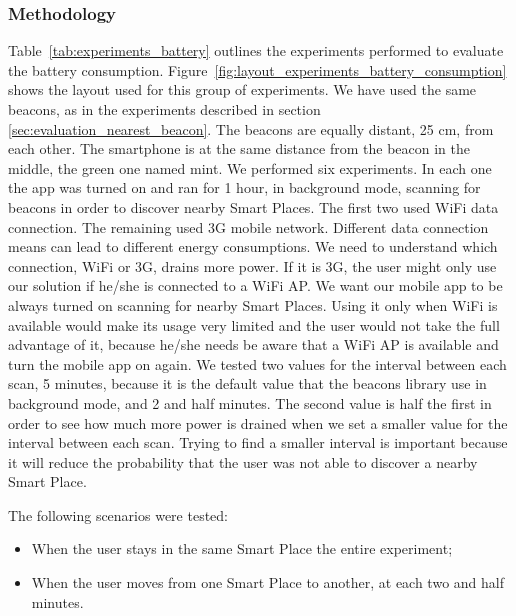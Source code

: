 \subsubsection{Methodology}
\label{sub:evaluation_energy_consumption_methodology}
Table~\ref{tab:experiments_battery} outlines the experiments performed to evaluate the battery consumption.
Figure~\ref{fig:layout_experiments_battery_consumption} shows the layout used for this group of experiments.
We have used the same beacons, as in the experiments described in section \ref{sec:evaluation_nearest_beacon}.
The beacons are equally distant, 25 cm, from each other.
The smartphone is at the same distance from the beacon in the middle, the green one named mint.
We performed six experiments.
In each one the app was turned on and ran for 1 hour, in background mode, scanning for beacons in order to discover nearby Smart Places.
The first two used \gls{WiFi} data connection.
The remaining used \gls{3G} mobile network.
Different data connection means can lead to different energy consumptions.
We need to understand which connection, \gls{WiFi} or \gls{3G}, drains more power.
If it is \gls{3G}, the user might only use our solution if he/she is connected to a \gls{WiFi} \gls{AP}.
We want our mobile app to be always turned on scanning for nearby Smart Places.
Using it only when \gls{WiFi} is available would make its usage very limited and the user would not take the full advantage of it, because he/she needs be aware that a \gls{WiFi} \gls{AP} is available and turn the mobile app on again.
We tested two values for the interval between each scan, 5 minutes, because it is the default value that the beacons library use in background mode, and 2 and half minutes.
The second value is half the first in order to see how much more power is drained when we set a smaller value for the interval between each scan.
Trying to find a smaller interval is important because it will reduce the probability that the user was not able to discover a nearby Smart Place.

The following scenarios were tested:
\begin{itemize}
  \item
  When the user stays in the same Smart Place the entire experiment;
  \item
  When the user moves from one Smart Place to another, at each two and half minutes.
\end{itemize}



